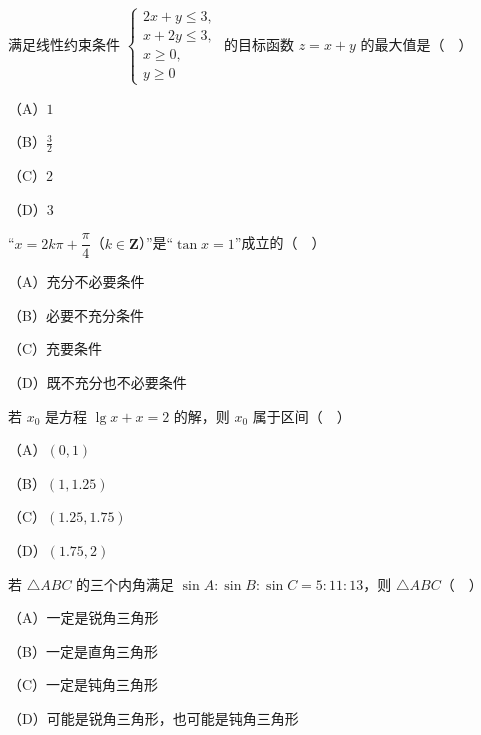 \begin{question}
满足线性约束条件 $\begin{cases}2x+y\leqslant3,\\ x+2y\leqslant3,\\ x\geqslant0,\\ y\geqslant0\end{cases}$ 的目标函数 $z=x+y$ 的最大值是（　）

（A）$1$

（B）$\frac32$

（C）$2$

（D）$3$

\end{question}
\begin{question}
“$x=2k\pi+\dfrac\pi4$（$k\in\mathbf Z$）”是“$\tan x=1$”成立的（　）

（A）充分不必要条件

（B）必要不充分条件

（C）充要条件

（D）既不充分也不必要条件

\end{question}
\begin{question}
若 $x_0$ 是方程 $\lg x+x=2$ 的解，则 $x_0$ 属于区间（　）

（A）$(0,1)$

（B）$(1,1.25)$

（C）$(1.25,1.75)$

（D）$(1.75,2)$

\end{question}
\begin{question}
若 $\triangle ABC$ 的三个内角满足 $\sin A:\sin B:\sin C=5:11:13$，则 $\triangle ABC$（　）

（A）一定是锐角三角形

（B）一定是直角三角形

（C）一定是钝角三角形

（D）可能是锐角三角形，也可能是钝角三角形

\end{question}

